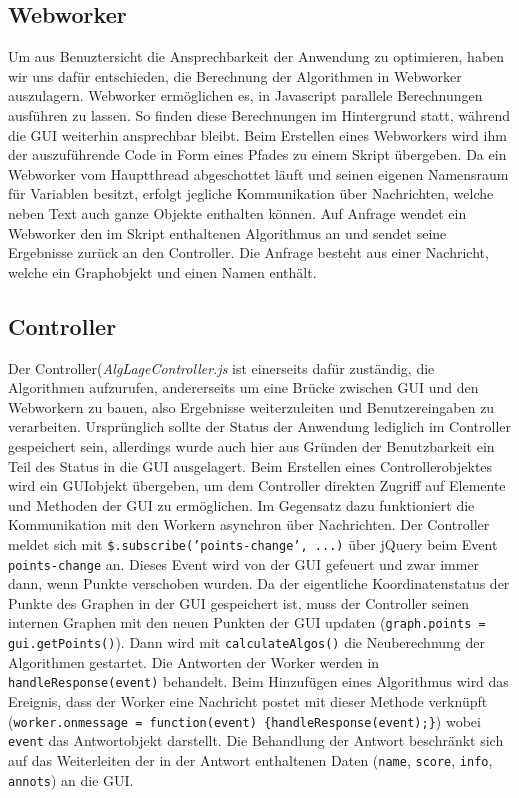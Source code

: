 \documentclass[a4paper,twocolumn]{scrartcl}
\begin{document}
\subsection{Webworker}
Um aus Benuztersicht die Ansprechbarkeit der Anwendung zu optimieren, haben wir uns dafür entschieden, die Berechnung der Algorithmen in Webworker auszulagern. Webworker ermöglichen es, in Javascript parallele Berechnungen ausführen zu lassen. So finden diese Berechnungen im Hintergrund statt, während die GUI weiterhin ansprechbar bleibt.
Beim Erstellen eines Webworkers wird ihm der auszuführende Code in Form eines Pfades zu einem Skript übergeben.
Da ein Webworker vom Hauptthread abgeschottet läuft und seinen eigenen Namensraum für Variablen besitzt, erfolgt jegliche Kommunikation über Nachrichten, welche neben Text auch ganze Objekte enthalten können.
Auf Anfrage wendet ein Webworker den im Skript enthaltenen Algorithmus an und sendet seine Ergebnisse zurück an den Controller. Die Anfrage besteht aus einer Nachricht, welche ein Graphobjekt und einen Namen enthält.

\subsection{Controller}
Der Controller(\emph{AlgLageController.js} ist einerseits dafür zuständig, die Algorithmen aufzurufen, andererseits um eine Brücke zwischen GUI und den Webworkern zu bauen, also Ergebnisse weiterzuleiten und Benutzereingaben zu verarbeiten. 
Ursprünglich sollte der Status der Anwendung lediglich im Controller gespeichert sein, allerdings wurde auch hier aus Gründen der Benutzbarkeit ein Teil des Status in die GUI ausgelagert.
Beim Erstellen eines Controllerobjektes wird ein GUIobjekt übergeben, um dem Controller direkten Zugriff auf Elemente und Methoden der GUI zu ermöglichen.
Im Gegensatz dazu funktioniert die Kommunikation mit den Workern asynchron über Nachrichten. Der Controller meldet sich mit \texttt{\$.subscribe('points-change', ...)} über jQuery beim Event \texttt{points-change} an. Dieses Event wird von der GUI gefeuert und zwar immer dann, wenn Punkte verschoben wurden. Da der eigentliche Koordinatenstatus der Punkte des Graphen in der GUI gespeichert ist, muss der Controller seinen internen Graphen mit den neuen Punkten der GUI updaten (\texttt{graph.points = gui.getPoints()}). Dann wird mit \texttt{calculateAlgos()} die Neuberechnung der Algorithmen gestartet.
Die Antworten der Worker werden in \texttt{handleResponse(event)} behandelt. Beim Hinzufügen eines Algorithmus wird das Ereignis, dass der Worker eine Nachricht postet mit dieser Methode verknüpft (\texttt{worker.onmessage = function(event) \{handleResponse(event);\}}) wobei \texttt{event} das Antwortobjekt darstellt.
Die Behandlung der Antwort beschränkt sich auf das Weiterleiten der in der Antwort enthaltenen Daten (\texttt{name}, \texttt{score}, \texttt{info}, \texttt{annots}) an die GUI.
\end{document}
